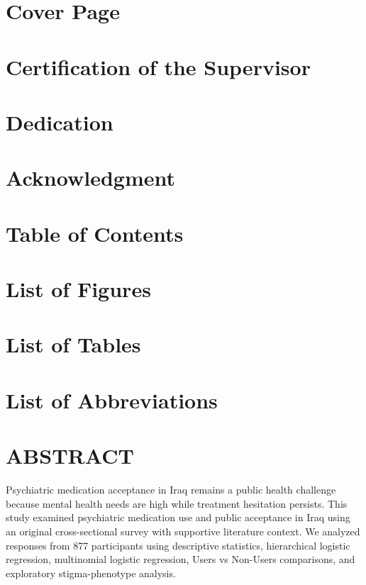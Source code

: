 \section{Cover Page}\label{cover-page}

\section{Certification of the
Supervisor}\label{certification-of-the-supervisor}

\section{Dedication}\label{dedication}

\section{Acknowledgment}\label{acknowledgment}

\section{Table of Contents}\label{table-of-contents}

\section{List of Figures}\label{list-of-figures}

\section{List of Tables}\label{list-of-tables}

\section{List of Abbreviations}\label{list-of-abbreviations}

\section{ABSTRACT}\label{abstract}

Psychiatric medication acceptance in Iraq remains a public health
challenge because mental health needs are high while treatment
hesitation persists. This study examined psychiatric medication use and
public acceptance in Iraq using an original cross-sectional survey with
supportive literature context. We analyzed responses from 877
participants using descriptive statistics, hierarchical logistic
regression, multinomial logistic regression, Users vs Non-Users
comparisons, and exploratory stigma-phenotype analysis.

